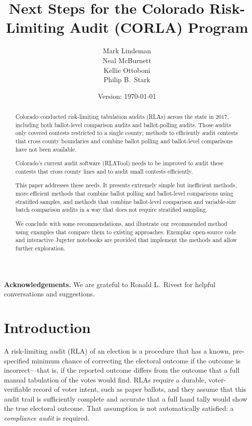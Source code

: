 \documentclass[12pt]{article}
\title{Next Steps for the Colorado Risk-Limiting Audit (CORLA) Program}
\author{
   Mark Lindeman\\
   Neal McBurnett\\
   Kellie Ottoboni\\
   Philip B.~Stark
}
\date{Version: \today}
\begin{document}
\maketitle


\begin{abstract}
Colorado conducted risk-limiting tabulation audits (RLAs) across the state in 2017,
including both ballot-level comparison audits and ballot-polling audits.
Those audits only covered contests restricted to a single county;
methods to efficiently audit contests that cross county boundaries
and combine ballot polling and ballot-level comparisons have not been available.

Colorado's current audit software (RLATool) needs to be improved to audit
these contests that cross county lines and to audit small contests efficiently.

This paper addresses these needs. 
It presents extremely simple but inefficient methods, more efficient methods
that combine ballot polling and ballot-level comparisons using stratified samples,
and methods that combine ballot-level comparison and
variable-size batch comparison audits in a way that does not require stratified
sampling.

We conclude with some recommendations, and illustrate our recommended method
using examples that compare them to existing approaches.
Exemplar open-source code and interactive Jupyter notebooks are provided
that implement the methods and allow further exploration.
\end{abstract}

\noindent
\textbf{Acknowledgements.}
We are grateful to Ronald L.~Rivest for helpful conversations and suggestions.

\section{Introduction}
A risk-limiting audit (RLA) of an election is a procedure that
has a known, pre-specified minimum chance of correcting the electoral outcome if the outcome
is incorrect---that is, if the reported outcome differs from the outcome that a full manual
tabulation of the votes would find. 
RLAs require a durable, voter-verifiable record of voter intent, such as paper ballots,
and they assume that this audit trail is sufficiently complete and accurate that a full hand
tally would show the true electoral outcome.
That assumption is not automatically satisfied: a \emph{compliance audit}
\citep{starkWagner12} 
is required.
\end{document}
